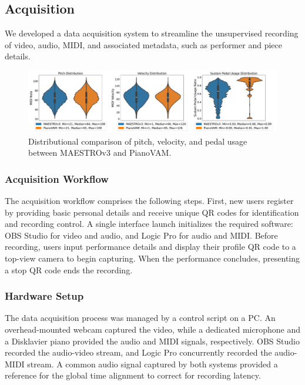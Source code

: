 \documentclass{article}
\begin{document}
\subsection{Acquisition}
We developed a data acquisition system to streamline the unsupervised recording of video, audio, MIDI, and associated metadata, such as performer and piece details.  
 
\begin{figure}
    \centering
    \includegraphics[width=1\linewidth]{Images/combined_violinplot.pdf}
    \vspace{-7mm}    
    \caption{Distributional comparison of pitch, velocity, and pedal usage between MAESTROv3 and PianoVAM.}
    \vspace{-3mm} 
    \label{fig:combined-violinplot}
\end{figure}


\subsubsection{Acquisition Workflow}
The acquisition workflow comprises the following steps. First, new users register by providing basic personal details and receive unique QR codes for identification and recording control. A single interface launch initializes the required software: OBS Studio for video and audio, and Logic Pro for audio and MIDI. Before recording, users input performance details and display their profile QR code to a top-view camera to begin capturing. When the performance concludes, presenting a stop QR code ends the recording.


\subsubsection{Hardware Setup} 
The data acquisition process was managed by a control script on a PC. An overhead-mounted webcam captured the video, while a dedicated microphone and a Disklavier piano provided the audio and MIDI signals, respectively. OBS Studio recorded the audio-video stream, and Logic Pro concurrently recorded the audio-MIDI stream. A common audio signal captured by both systems provided a reference for the global time alignment to correct for recording latency. %
\end{document}
